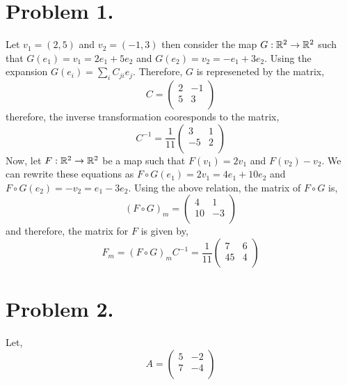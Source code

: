\documentclass[12pt]{extarticle}
\begin{document}
 
\section*{Problem 1.}

Let $v_1 = (2, 5)$ and $v_2 = (-1, 3)$ then consider the map $G : \mathbb{R}^2 \to \mathbb{R}^2$ such that $G(e_1) = v_1 = 2 e_1 + 5 e_2$ and $G(e_2) = v_2 = - e_1 + 3 e_2$. Using the expansion $G(e_i) = \sum_{i} C_{ji} e_j$. Therefore, $G$ is represeneted by the matrix, 
\[ 
C = \begin{pmatrix}
2 & -1 \\
5 & 3 \\
\end{pmatrix} 
\]  
therefore, the inverse transformation cooresponds to the matrix,
\[ 
C^{-1} = \frac{1}{11} \begin{pmatrix}
3 & 1 \\
-5 & 2 \\
\end{pmatrix} 
\]  
Now, let $F : \mathbb{R}^2 \to \mathbb{R}^2$ be a map such that $F(v_1) = 2v_1$ and $F(v_2) - v_2$. We can rewrite these equations as $F \circ G(e_1) = 2 v_1 = 4 e_1 + 10 e_2$ and $F \circ G(e_2) = -v_2 =  e_1 - 3 e_2$. Using the above relation, the matrix of $F \circ G$ is,
\[ 
(F \circ G)_m = \begin{pmatrix}
4 & 1 \\
10 & -3 \\
\end{pmatrix} 
\]  
and therefore, the matrix for $F$ is given by,
\[F_m = (F \circ G)_m C^{-1} = \frac{1}{11} 
\begin{pmatrix}
7 & 6 \\
45 & 4 \\
\end{pmatrix} 
\]

\section*{Problem 2.}
Let,
\[ 
A = \begin{pmatrix}
5 & -2 \\
7 & -4 \\
\end{pmatrix} 
\] 
 
\end{document}
